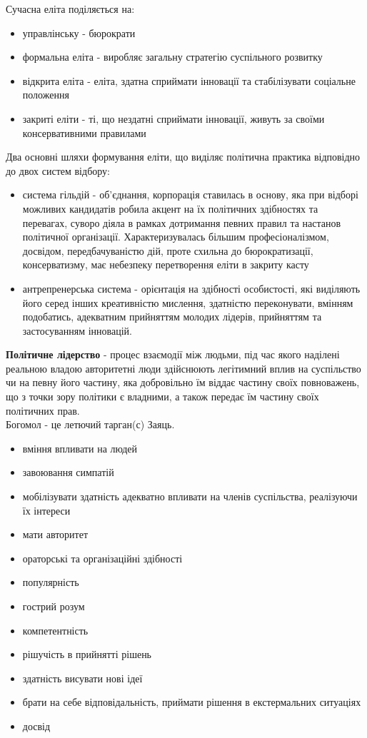 Сучасна еліта поділяється на:
\begin{itemize}
\item управлінську - бюрократи
\item формальна еліта - виробляє загальну стратегію суспільного розвитку
\item відкрита еліта - еліта, здатна сприймати інновації та стабілізувати соціальне положення
\item закриті еліти - ті, що нездатні сприймати інновації, живуть за своїми консервативними правилами
\end{itemize}
Два основні шляхи формування еліти, що виділяє політична практика відповідно до двох систем відбору:
\begin{itemize}
\item система гільдій - об’єднання, корпорація ставилась в основу, яка при  відборі можливих  кандидатів робила акцент на їх політичних здібностях та перевагах, суворо діяла в рамках дотримання певних правил та настанов політичної організації. Характеризувалась більшим професіоналізмом, досвідом, передбачуваністю дій, проте схильна до бюрократизації, консерватизму, має небезпеку перетворення еліти в закриту касту
\item антрепренерська система - орієнтація на здібності особистості, які виділяють його серед інших креативністю мислення, здатністю переконувати, вмінням подобатись, адекватним прийняттям молодих лідерів, прийняттям та застосуванням інновацій. 
\end{itemize}
\textbf{Політичне лідерство} - процес взаємодії між людьми, під час якого наділені реальною владою авторитетні люди здійснюють легітимний вплив на суспільство чи на певну його частину, яка добровільно їм віддає частину своїх повноважень, що з точки зору політики є владними, а також передає їм частину своїх політичних прав.\\
Богомол - це летючий тарган(с) Заяць.\\
\begin{itemize}
\item вміння впливати на людей
\item завоювання симпатій
\item мобілізувати здатність адекватно впливати на членів суспільства, реалізуючи їх інтереси
\item мати авторитет
\item ораторські та організаційні здібності
\item популярність 
\item гострий розум
\item компетентність
\item рішучість  в прийнятті рішень
\item здатність висувати нові ідеї
\item брати на себе відповідальність, приймати рішення в екстермальних ситуаціях
\item досвід
\end{itemize}

